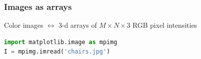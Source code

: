 \begin{frame}[fragile]
  \frametitle{Images as arrays}

  \begin{center}
    Color images $\leftrightarrow$ 3-d arrays of $M \times N \times 3$ RGB pixel intensities
    \vskip20pt
  \end{center}

    \begin{block}{}
        \begin{lstlisting}[language=python]
import matplotlib.image as mpimg
I = mpimg.imread('chairs.jpg')
        \end{lstlisting}
    \end{block}

\end{frame}


